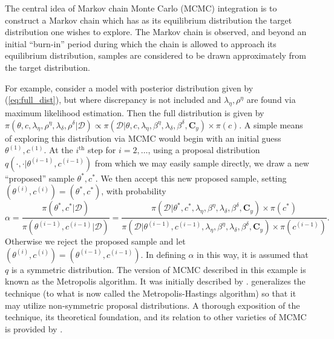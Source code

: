\documentclass{article}
\begin{document}
The central idea of Markov chain Monte Carlo (MCMC) integration is to construct a Markov chain which has as its equilibrium distribution the target distribution one wishes to explore. The Markov chain is observed, and beyond an initial ``burn-in'' period during which the chain is allowed to approach its equilibrium distribution, samples are considered to be drawn approximately from the target distribution.

For example, consider a model with posterior distribution given by (\ref{eq:full_dist}), but where discrepancy is not included and $\lambda_\eta,\rho^\eta$ are found via maximum likelihood estimation. Then the full distribution is given by $\pi(\theta,c,\lambda_\eta,\rho^\eta,\lambda_\delta,\rho^\delta|\mathcal D)
\propto \pi(\mathcal D | \theta,c,\lambda_\eta, \beta^\eta,\lambda_\delta,\beta^\delta,\mathbf C_y) \times \pi(c)$. A simple means of exploring this distribution via MCMC would begin with an initial guess $\theta^{(1)},c^{(1)}$. At the $i^{\text{th} }$ step for $i=2,\ldots$, using a proposal distribution $q(\cdot,\cdot|{\theta^{(i-1)},c^{(i-1)}})$ from which we may easily sample directly, we draw a new ``proposed'' sample $\theta^*,c^*$. We then accept this new proposed sample, setting $(\theta^{(i)},c^{(i)}) = (\theta^*,c^*)$, with probability
\begin{equation}\label{eq:mh-acceptance}
\alpha = \frac{\pi(\theta^*,c^* | \mathcal D)}{ \pi(\theta^{(i-1)},c^{(i-1)}|\mathcal D) } = 
\frac{ \pi(\mathcal D | \theta^*,c^*,\lambda_\eta, \beta^\eta,\lambda_\delta,\beta^\delta,\mathbf C_y) \times \pi(c^*)}{\pi(\mathcal D | \theta^{(i-1)},c^{(i-1)},\lambda_\eta, \beta^\eta,\lambda_\delta,\beta^\delta,\mathbf C_y) \times \pi(c^{(i-1)})}.
\end{equation}
Otherwise we reject the proposed sample and let $(\theta^{(i)},c^{(i)}) = (\theta^{(i-1)},c^{(i-1)})$. 
In defining $\alpha$ in this way, it is assumed that $q$ is a symmetric distribution. The version of MCMC described in this example is known as the Metropolis algorithm. It was initially described by \cite{Metropolis1953}. \cite{Hastings1970} generalizes the technique (to what is now called the Metropolis-Hastings algorithm) so that it may utilize non-symmetric proposal distributions. A thorough exposition of the technique, its theoretical foundation, and its relation to other  varieties of MCMC is provided by \cite{Chib1995}.
\end{document}
